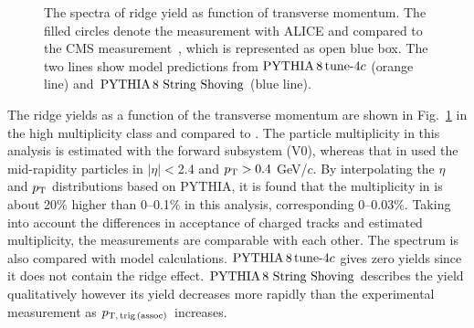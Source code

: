 \begin{figure}[h!]
	\centering
	\caption{ The spectra of ridge yield as function of transverse momentum. The filled circles denote the measurement with ALICE and compared to the CMS measurement~\cite{Khachatryan:2015lva}, which is represented as open blue box. The two lines show model predictions from $\mathrm{PYTHIA}\,8\,\mathrm{tune}{\text -}4c$ (orange line) and $\mathrm{PYTHIA}\,8~\mathrm{String}~\mathrm{Shoving}$ (blue line). }
	\label{fig:PlotYSpect}
\end{figure}

The ridge yields as a function of the transverse momentum are shown in Fig.~\ref{fig:PlotYSpect} in the high multiplicity class and compared to \cite{Khachatryan:2015lva}. The particle multiplicity in this analysis is estimated with the forward subsystem (V0), whereas that in \cite{Khachatryan:2015lva}  used the mid-rapidity particles in $|\eta|<$2.4 and $p_\mathrm{T}>0.4$ GeV/$c$. By interpolating the $\eta$ and $p_\mathrm{T}{}$ distributions based on PYTHIA, it is found that the multiplicity in \cite{Khachatryan:2015lva} is about 20\% higher than 0--0.1\% in this analysis, corresponding 0--0.03\%. Taking into account the differences in acceptance of charged tracks and estimated multiplicity, the measurements are comparable with each other. The spectrum is also compared with model calculations. $\mathrm{PYTHIA}\,8\,\mathrm{tune}{\text -}4c$ gives zero yields since it does not contain the ridge effect. $\mathrm{PYTHIA}\,8~\mathrm{String}~\mathrm{Shoving}$ describes the yield qualitatively however its yield decreases more rapidly than the experimental measurement as $p_\mathrm{T,\,trig\,(assoc)}$ increases.

